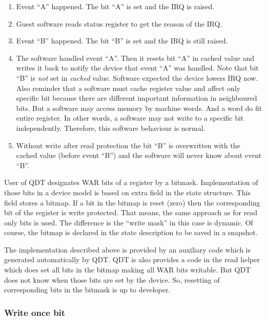 \documentclass[conference,compsoc,a4paper]{IEEEtran}
\begin{document}
\begin{enumerate}
    \item Event ``A'' happened.
    The bit ``A'' is set and the IRQ is raised.
    \item Guest software reads status register to get the reason of the
    IRQ.
    \item Event ``B'' happened.
    The bit ``B'' is set and the IRQ is still raised.
    \item The software handled event ``A''.
    Then it resets bit ``A'' in cached value and writes it back to notify
    the device that event ``A'' was handled.
    Note that bit ``B'' is \textit{not} set in \textit{cached} value.
    Software expected the device lowers IRQ now.
    Also reminder that a software must cache register value and affect only
    specific bit because there are different important information in
    neighboured bits.
    But a software may access memory by machine words.
    And a word do fit entire register.
    In other words, a software may not write to a specific bit
    independently.
    Therefore, this software behaviour is normal.
    \item Without write after read protection the bit ``B''
    is overwritten with the cached value (before event ``B'') and
    the software will never know about event ``B''.
\end{enumerate}

User of QDT designates WAR bits of a register by a bitmask.
Implementation of those bits in a device model is based on extra
field in the state structure.
This field stores a bitmap.
If a bit in the bitmap is reset (zero) then the corresponding bit of
the register is write protected.
That means, the same approach as for read only bits is used.
The difference is the ``write mask'' in this case is dynamic.
Of course, the bitmap is declared in the state description to be saved
in a snapshot.

The implementation described above is provided by an auxiliary code
which is generated automatically by QDT.
QDT is also provides a code in the read helper which does set all
bits in the bitmap making all WAR bits writable.
But QDT does not know when those bits are set by the device.
So, resetting of corresponding bits in the bitmask is up to developer.

\subsubsection{Write once bit}
\end{document}
